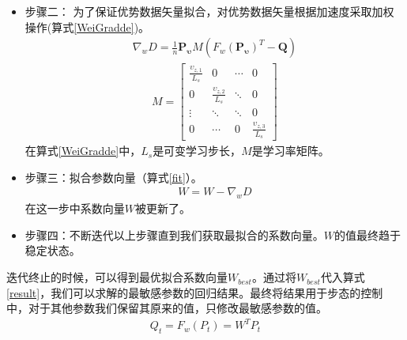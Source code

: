 \begin{itemize}
	\item 步骤二： 为了保证优势数据矢量拟合，对优势数据矢量根据加速度采取加权操作(算式\ref{WeiGradde})。
	\begin{eqnarray}
	\nabla_{w}D=\frac{1}{n}\bm{P_{\upsilon}}M(F_{w}(\bm{P_{\upsilon}})^{T}-\bm{Q})
	\end{eqnarray}
	\begin{eqnarray}\label{WeiGradde}
	M=\begin{bmatrix}
	\frac{\upsilon_{z,1}}{L_{s}}&0&\cdots&0\\
	0&\frac{\upsilon_{z,2}}{L_{s}}&\ddots&0\\
	\vdots&\ddots&\ddots&0\\
	0&\cdots&0&\frac{\upsilon_{z,3}}{L_{s}}
	\end{bmatrix}
	\end{eqnarray}
	在算式\ref{WeiGradde}中，$L_s$是可变学习步长，$M$是学习率矩阵。
	
	\item 步骤三：拟合参数向量（算式\ref{fit}）。
	\begin{eqnarray}\label{fit}
	W=W-\nabla_{w}D
	\end{eqnarray}
	在这一步中系数向量$W$被更新了。
	
	\item 步骤四：不断迭代以上步骤直到我们获取最拟合的系数向量。$W$的值最终趋于稳定状态。
\end{itemize}

迭代终止的时候，可以得到最优拟合系数向量$W_{best}$。通过将$W_{best}$代入算式\ref{result}，我们可以求解的最敏感参数的回归结果。最终将结果用于步态的控制中，对于其他参数我们保留其原来的值，只修改最敏感参数的值。
\begin{eqnarray}\label{result}
Q_{t} = F_{w}(P_{t})=W^{T}P_{t}
\end{eqnarray}